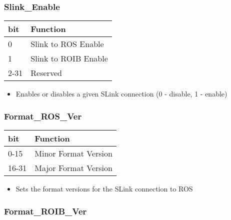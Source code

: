 \subsubsection{Slink\_Enable}

\begin {table}[H]
\begin{center}
\begin{tabular}{|l|l|}
\hline
\textbf{bit} & \textbf{Function} \\
\hline
0 & Slink to ROS Enable \\
\hline
1 & Slink to ROIB Enable \\
\hline
2-31 & Reserved \\
\hline
\end{tabular}
\end{center}
\end{table}


\begin{itemize}
\item Enables or disables a given SLink connection (0 - disable, 1 - enable)
\end{itemize}



\subsubsection{Format\_ROS\_Ver}

\begin {table}[H]
\begin{center}
\begin{tabular}{|l|l|}
\hline
\textbf{bit} & \textbf{Function} \\
\hline
0-15 & Minor Format Version \\
\hline
16-31 & Major Format Version \\
\hline
\end{tabular}
\end{center}
\end{table}


\begin{itemize}
\item Sets the format versions for the SLink connection to ROS
\end{itemize}



\subsubsection{Format\_ROIB\_Ver}

